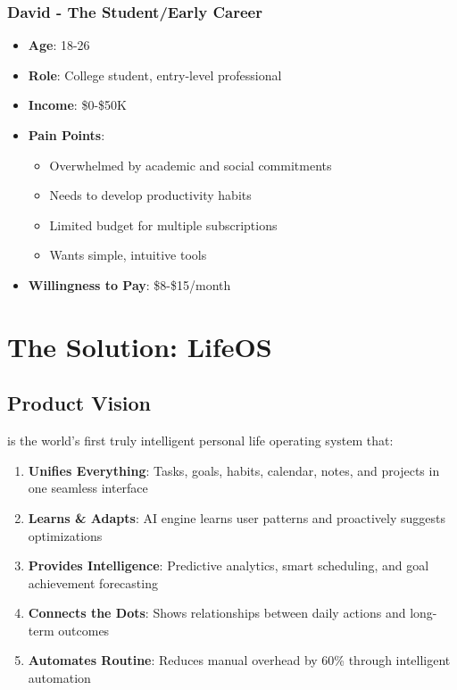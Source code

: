 \subsubsection{David - The Student/Early Career}

\begin{itemize}
    \item \textbf{Age}: 18-26
    \item \textbf{Role}: College student, entry-level professional
    \item \textbf{Income}: \$0-\$50K
    \item \textbf{Pain Points}:
    \begin{itemize}
        \item Overwhelmed by academic and social commitments
        \item Needs to develop productivity habits
        \item Limited budget for multiple subscriptions
        \item Wants simple, intuitive tools
    \end{itemize}
    \item \textbf{Willingness to Pay}: \$8-\$15/month
\end{itemize}

\section{The Solution: LifeOS}

\subsection{Product Vision}

\lifeos{} is the world's first truly intelligent personal life operating system that:

\begin{enumerate}
    \item \textbf{Unifies Everything}: Tasks, goals, habits, calendar, notes, and projects in one seamless interface
    \item \textbf{Learns \& Adapts}: AI engine learns user patterns and proactively suggests optimizations
    \item \textbf{Provides Intelligence}: Predictive analytics, smart scheduling, and goal achievement forecasting
    \item \textbf{Connects the Dots}: Shows relationships between daily actions and long-term outcomes
    \item \textbf{Automates Routine}: Reduces manual overhead by 60\% through intelligent automation
\end{enumerate}

